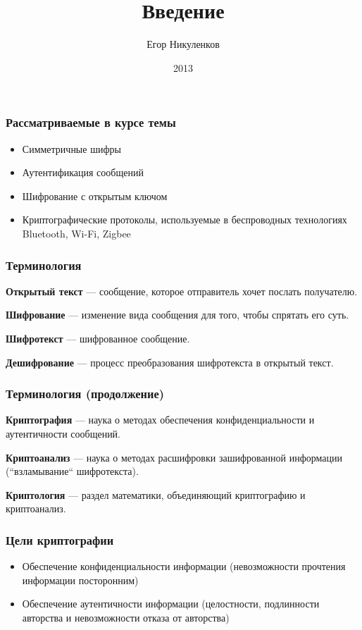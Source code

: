\documentclass{beamer}
\title{Введение}
\author{Егор Никуленков}
\institute{ВГУ}
\date{2013}
\newcommand{\define}[2]{{\bf #1} --- #2.\vspace{1em}}
\begin{document}
\frame{\titlepage}

\begin{frame}
  \frametitle{Рассматриваемые в курсе темы}

  \begin{itemize}
    \item{Симметричные шифры}
    \item{Аутентификация сообщений}
    \item{Шифрование с открытым ключом}
    \item{Криптографические протоколы, используемые в беспроводных технологиях Bluetooth, Wi-Fi, Zigbee}
  \end{itemize}
\end{frame}


\begin{frame}
  \frametitle{Терминология}

  \define{Открытый текст} {сообщение, которое отправитель хочет послать получателю}

  \define{Шифрование} {изменение вида сообщения для того, чтобы спрятать его суть}

  \define{Шифротекст} {шифрованное сообщение}

  \define{Дешифрование} {процесс преобразования шифротекста в открытый текст}
\end{frame}


\begin{frame}
  \frametitle{Терминология (продолжение)}

  \define{Криптография} {наука о методах обеспечения конфиденциальности и аутентичности сообщений}

  \define{Криптоанализ} {наука о методах расшифровки зашифрованной информации (``взламывание`` шифротекста)}

  \define{Криптология} {раздел математики, объединяющий криптографию и криптоанализ}
\end{frame}


\begin{frame}
  \frametitle{Цели криптографии}

  \begin{itemize}
    \itemsep 2em
    \item{Обеспечение конфиденциальности информации (невозможности прочтения информации посторонним)}
    \item{Обеспечение аутентичности информации (целостности, подлинности авторства и невозможности отказа от авторства)}
  \end{itemize}
\end{frame}
\end{document}
